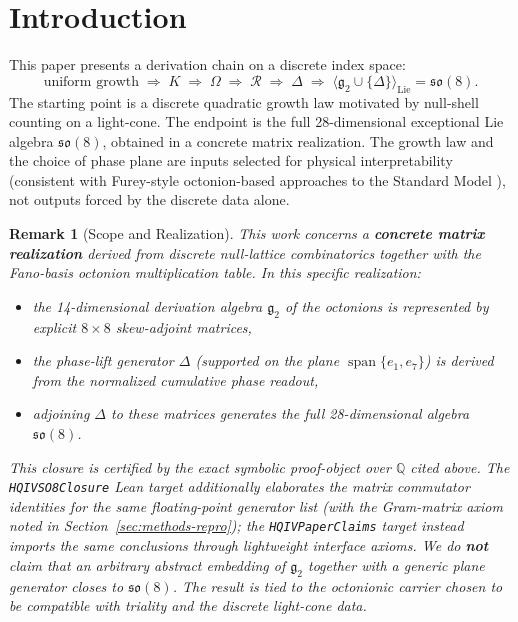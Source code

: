 \documentclass[11pt]{amsart}
\newtheorem{remark}[theorem]{Remark}
\begin{document}
\section{Introduction}\label{sec:intro}

This paper presents a derivation chain on a discrete index space:
\[
\text{uniform growth} \;\Longrightarrow\; K \;\Longrightarrow\; \Omega \;\Longrightarrow\; \mathcal{R} \;\Longrightarrow\; \Delta \;\Longrightarrow\; \langle \mathfrak{g}_2 \cup \{\Delta\} \rangle_{\mathrm{Lie}} = \mathfrak{so}(8).
\]
The starting point is a discrete quadratic growth law motivated by null-shell counting on a light-cone. The endpoint is the full 28-dimensional exceptional Lie algebra \(\mathfrak{so}(8)\), obtained in a concrete matrix realization. The growth law and the choice of phase plane are inputs selected for physical interpretability (consistent with Furey-style octonion-based approaches to the Standard Model \cite{furey,baez,g2}), not outputs forced by the discrete data alone.

\begin{remark}[Scope and Realization]
This work concerns a \textbf{concrete matrix realization} derived from discrete null-lattice combinatorics together with the Fano-basis octonion multiplication table. In this specific realization:
\begin{itemize}
  \item the 14-dimensional derivation algebra \(\mathfrak{g}_2\) of the octonions is represented by explicit \(8\times 8\) skew-adjoint matrices,
  \item the phase-lift generator \(\Delta\) (supported on the plane \(\operatorname{span}\{e_1,e_7\}\)) is derived from the normalized cumulative phase readout,
  \item adjoining \(\Delta\) to these matrices generates the full 28-dimensional algebra \(\mathfrak{so}(8)\).
\end{itemize}
\begin{sloppypar}
This closure is certified by the exact symbolic proof-object over \(\mathbb{Q}\) cited above. The \texttt{HQIVSO8Closure} Lean target additionally elaborates the matrix commutator identities for the same floating-point generator list (with the Gram-matrix axiom noted in Section~\ref{sec:methods-repro}); the \texttt{HQIVPaperClaims} target instead imports the same conclusions through lightweight interface axioms. We do \textbf{not} claim that an arbitrary abstract embedding of \(\mathfrak{g}_2\) together with a generic plane generator closes to \(\mathfrak{so}(8)\). The result is tied to the octonionic carrier chosen to be compatible with triality and the discrete light-cone data.
\end{sloppypar}
\end{remark}
\end{document}
